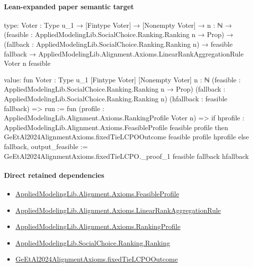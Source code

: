 \documentclass[10pt]{article}
\begin{document}
\paragraph{Lean-expanded paper semantic target}
\begin{ReviewVerbatim}
type:
{Voter : Type u_1} →
  [Fintype Voter] →
    [Nonempty Voter] →
      {n : ℕ} →
        (feasible : AppliedModelingLib.SocialChoice.Ranking.Ranking n → Prop) →
          (fallback : AppliedModelingLib.SocialChoice.Ranking.Ranking n) →
            feasible fallback → AppliedModelingLib.Alignment.Axioms.LinearRankAggregationRule Voter n feasible

value:
fun {Voter : Type u_1} [Fintype Voter] [Nonempty Voter] {n : ℕ}
    (feasible : AppliedModelingLib.SocialChoice.Ranking.Ranking n → Prop)
    (fallback : AppliedModelingLib.SocialChoice.Ranking.Ranking n) (hfallback : feasible fallback) =>
  {
    run := fun (profile : AppliedModelingLib.Alignment.Axioms.RankingProfile Voter n) =>
      if hprofile : AppliedModelingLib.Alignment.Axioms.FeasibleProfile feasible profile then
        GeEtAl2024AlignmentAxioms.fixedTieLCPOOutcome feasible profile hprofile
      else fallback,
    output_feasible := GeEtAl2024AlignmentAxioms.fixedTieLCPO._proof_1 feasible fallback hfallback }
\end{ReviewVerbatim}

\paragraph{Direct retained dependencies}
\begin{itemize}\raggedright
\item \hyperlink{library-prerequisite-5fa7bdb49b050adf}{Applied\allowbreak{}Modeling\allowbreak{}Lib.\allowbreak{}Alignment.\allowbreak{}Axioms.\allowbreak{}Feasible\allowbreak{}Profile}
\item \hyperlink{library-prerequisite-43447e121a1884f9}{Applied\allowbreak{}Modeling\allowbreak{}Lib.\allowbreak{}Alignment.\allowbreak{}Axioms.\allowbreak{}Linear\allowbreak{}Rank\allowbreak{}Aggregation\allowbreak{}Rule}
\item \hyperlink{library-prerequisite-9bded048a60dfe0a}{Applied\allowbreak{}Modeling\allowbreak{}Lib.\allowbreak{}Alignment.\allowbreak{}Axioms.\allowbreak{}Ranking\allowbreak{}Profile}
\item \hyperlink{library-prerequisite-5cde54446d1ae021}{Applied\allowbreak{}Modeling\allowbreak{}Lib.\allowbreak{}Social\allowbreak{}Choice.\allowbreak{}Ranking.\allowbreak{}Ranking}
\item \hyperlink{governing-declaration-a5e525adf0c1ca13}{Ge\allowbreak{}Et\allowbreak{}Al2024\allowbreak{}Alignment\allowbreak{}Axioms.\allowbreak{}fixed\allowbreak{}Tie\allowbreak{}LCPO\allowbreak{}Outcome}
\end{itemize}
\end{document}
